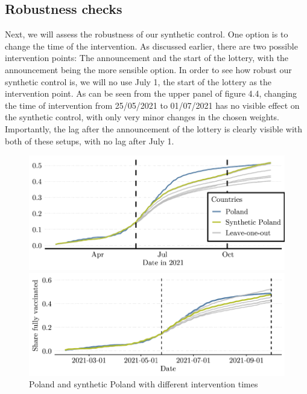 \documentclass{scrbook}
\begin{document}
\subsection*{Robustness checks}

Next, we will assess the robustness of our synthetic control. One option
is to change the time of the intervention. As discussed earlier, there
are two possible intervention points: The announcement and the start of
the lottery, with the announcement being the more sensible option. In
order to see how robust our synthetic control is, we will no use July 1,
the start of the lottery as the intervention point. As can be seen from
the upper panel of figure 4.4, changing the time of intervention from
25/05/2021 to 01/07/2021 has no visible effect on the synthetic control,
with only very minor changes in the chosen weights. Importantly, the lag
after the announcement of the lottery is clearly visible with both of
these setups, with no lag after July 1.

\begin{figure}[h]
\caption{Poland and synthetic Poland with different intervention times}

\begin{center}\includegraphics{bachelor_thesis_files/figure-latex/unnamed-chunk-6-1} \end{center}



\begin{center}\includegraphics{bachelor_thesis_files/figure-latex/unnamed-chunk-6-2} \end{center}
\end{figure}
\end{document}
